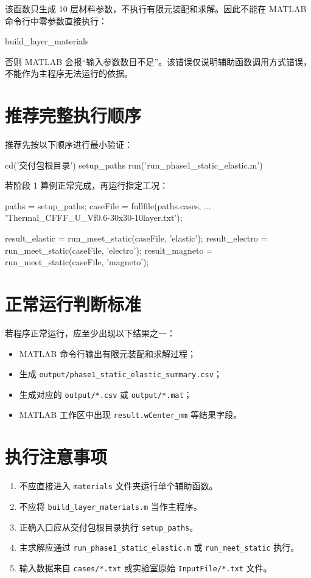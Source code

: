 \documentclass[UTF8,fontset=windows]{ctexart}
\begin{document}
该函数只生成 10 层材料参数，不执行有限元装配和求解。因此不能在 MATLAB 命令行中零参数直接执行：

\begin{code}
build_layer_materials
\end{code}

否则 MATLAB 会报“输入参数数目不足”。该错误仅说明辅助函数调用方式错误，不能作为主程序无法运行的依据。

\section{推荐完整执行顺序}

推荐先按以下顺序进行最小验证：

\begin{code}
cd('交付包根目录')
setup_paths
run('run_phase1_static_elastic.m')
\end{code}

若阶段 1 算例正常完成，再运行指定工况：

\begin{code}
paths = setup_paths;
caseFile = fullfile(paths.cases, ...
    'Thermal_CFFF_U_Vf0.6-30x30-10layer.txt');

result_elastic = run_meet_static(caseFile, 'elastic');
result_electro = run_meet_static(caseFile, 'electro');
result_magneto = run_meet_static(caseFile, 'magneto');
\end{code}

\section{正常运行判断标准}

若程序正常运行，应至少出现以下结果之一：

\begin{itemize}
  \item MATLAB 命令行输出有限元装配和求解过程；
  \item 生成 \texttt{output/phase1\_static\_elastic\_summary.csv}；
  \item 生成对应的 \texttt{output/*.csv} 或 \texttt{output/*.mat}；
  \item MATLAB 工作区中出现 \texttt{result.wCenter\_mm} 等结果字段。
\end{itemize}

\section{执行注意事项}

\begin{enumerate}
  \item 不应直接进入 \texttt{materials} 文件夹运行单个辅助函数。
  \item 不应将 \texttt{build\_layer\_materials.m} 当作主程序。
  \item 正确入口应从交付包根目录执行 \texttt{setup\_paths}。
  \item 主求解应通过 \texttt{run\_phase1\_static\_elastic.m} 或 \texttt{run\_meet\_static} 执行。
  \item 输入数据来自 \texttt{cases/*.txt} 或实验室原始 \texttt{InputFile/*.txt} 文件。
\end{enumerate}
\end{document}
